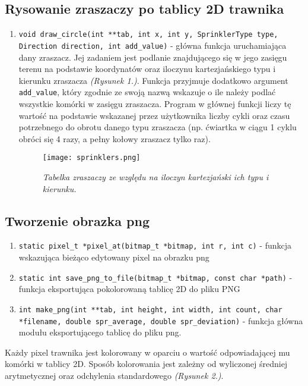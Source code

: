 \documentclass[a4paper]{article}
\begin{document}
\subsection{Rysowanie zraszaczy po tablicy 2D trawnika}
\begin{enumerate}
    \item \texttt{void draw_circle(int **tab, int x, int y, SprinklerType type, Direction direction, int add_value)} - główna funkcja uruchamiająca dany zraszacz. Jej zadaniem jest podlanie znajdującego się w jego zasięgu terenu na podstawie koordynatów oraz iloczynu kartezjańskiego typu i kierunku zraszacza \textit{(Rysunek 1.)}. Funkcja przyjmuje dodatkowo argument \texttt{add_value}, który zgodnie ze swoją nazwą wskazuje o ile należy podlać wszystkie komórki w zasięgu zraszacza. Program w głównej funkcji liczy tę wartość na podstawie wskazanej przez użytkownika liczby cykli oraz czasu potrzebnego do obrotu danego typu zraszacza (np. ćwiartka w ciągu 1 cyklu obróci się 4 razy, a pełny kołowy zraszacz tylko raz).
          \begin{figure}[H]
              \texttt{[image: sprinklers.png]}
              \centering
              \caption{\textit{Tabelka zraszaczy ze względu na iloczyn kartezjański ich typu i kierunku.}}
          \end{figure}
\end{enumerate}

\subsection{Tworzenie obrazka png}
\begin{enumerate}
    \item \texttt{static pixel_t *pixel_at(bitmap_t *bitmap, int r, int c)} - funkcja wskazująca bieżąco edytowany pixel na obrazku png
    \item \texttt{static int save_png_to_file(bitmap_t *bitmap, const char *path)} - funkcja eksportująca pokolorowaną tablicę 2D do pliku PNG
    \item \texttt{int make_png(int **tab, int height, int width, int count, char *filename, double spr_average, double spr_deviation)} - funkcja główna modułu eksportującego tablicę do pliku png.
\end{enumerate}

Każdy pixel trawnika jest kolorowany w oparciu o wartość odpowiadającej mu komórki w tablicy 2D. Sposób kolorowania jest zależny od wyliczonej średniej arytmetycznej oraz odchylenia standardowego \textit{(Rysunek 2.)}.
\end{document}
